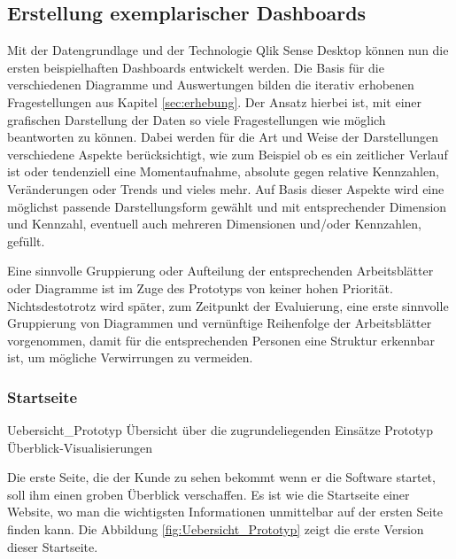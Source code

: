 \subsection{Erstellung exemplarischer Dashboards} 
\label{sub:erstellungDashboards}
Mit der Datengrundlage und der Technologie Qlik Sense Desktop können nun die ersten beispielhaften Dashboards entwickelt werden.
Die Basis für die verschiedenen Diagramme und Auswertungen bilden die iterativ erhobenen Fragestellungen aus Kapitel \ref{sec:erhebung}. 
Der Ansatz hierbei ist, mit einer grafischen Darstellung der Daten so viele Fragestellungen wie möglich beantworten zu können.
Dabei werden für die Art und Weise der Darstellungen verschiedene Aspekte berücksichtigt, wie zum Beispiel ob es ein zeitlicher Verlauf ist oder tendenziell eine Momentaufnahme, absolute gegen relative Kennzahlen, Veränderungen oder Trends und vieles mehr.
Auf Basis dieser Aspekte wird eine möglichst passende Darstellungsform gewählt und mit entsprechender Dimension und Kennzahl, eventuell auch mehreren Dimensionen und/oder Kennzahlen, gefüllt.

Eine sinnvolle Gruppierung oder Aufteilung der entsprechenden Arbeitsblätter oder Diagramme ist im Zuge des Prototyps von keiner hohen Priorität. 
Nichtsdestotrotz wird später, zum Zeitpunkt der Evaluierung, eine erste sinnvolle Gruppierung von Diagrammen und vernünftige Reihenfolge der Arbeitsblätter vorgenommen, damit für die entsprechenden Personen eine Struktur erkennbar ist, um mögliche Verwirrungen zu vermeiden.



\subsubsection{Startseite}
\label{subsub:start}
\bildbreit
{Uebersicht_Prototyp}
{Übersicht über die zugrundeliegenden Einsätze}
{Prototyp Überblick-Visualisierungen}

Die erste Seite, die der Kunde zu sehen bekommt wenn er die Software startet, soll ihm einen groben Überblick verschaffen. 
Es ist wie die Startseite einer Website, wo man die wichtigsten Informationen unmittelbar auf der ersten Seite finden kann.
Die Abbildung \ref{fig:Uebersicht_Prototyp} zeigt die erste Version dieser Startseite.

